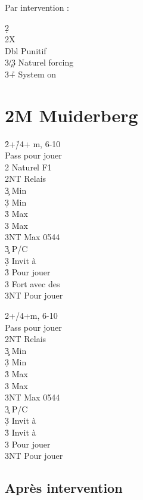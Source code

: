 \documentclass[a4paper]{article}
\begin{document}
Par intervention :

\begin{bidtable}
2\d\+\\
2X\+\\
Dbl \> Punitif\\
3\c/3\d \> Naturel forcing\\
3\h+ \> System on\-\-
\end{bidtable}

\section{2M Muiderberg}

\begin{bidtable}
2\h {}+\h /4+ m, 6-10\+\\
Pass \> pour jouer\\
2\s \> Naturel F1\\
2NT \> Relais\+\\
3\c \> Min \c \\
3\d \> Min \d \\
3\h \> Max \c \\
3\s \> Max \d \\
3NT \> Max 0544\-\\
3\c \> P/C\\
3\d \> Invit à \h \\
3\h \> Pour jouer\\
3\s \> Fort avec des \s \\
3NT \> Pour jouer\-
\end{bidtable}

\begin{bidtable}
2\s {}+\s /4+m, 6-10\+\\
Pass \> pour jouer\\
2NT \> Relais\+\\
3\c \> Min \c \\
3\d \> Min \d \\
3\h \> Max \c \\
3\s \> Max \d \\
3NT \> Max 0544\-\\
3\c \> P/C\\
3\d \> Invit à \h \\
3\h \> Invit à \s \\
3\s \> Pour jouer\\
3NT \> Pour jouer\-
\end{bidtable}

\subsection{Après intervention}
\end{document}
